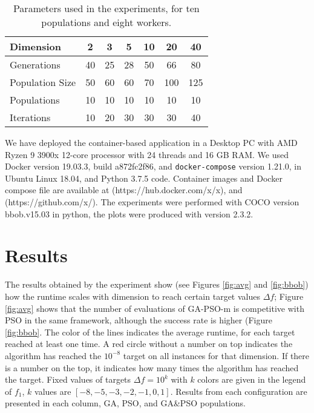 \begin{table}[h!tb]
  \small
  \caption{Parameters used in the experiments, for ten populations and eight workers.
  }
  \label{tab:params:10}
  \vspace{0.25cm}
  \centering
  \small
  \begin{tabular}{|l|c|c|c|c|c|c|}
    \hline
    Dimension        & 2  & 3  & 5  & 10 & 20  & 40  \\ \hline
    Generations      & 40 & 25 & 28 & 50 & 66  & 80  \\ \hline
    Population Size  & 50 & 60 & 60 & 70 & 100 & 125 \\ \hline
    Populations      & 10 & 10 & 10 & 10 & 10  & 10  \\ \hline
    Iterations       & 10 & 20 & 30 & 30 & 30  & 40  \\ \hline  
  \end{tabular}
\end{table}

We have deployed the container-based application in a
Desktop PC with AMD Ryzen 9 3900x 12-core processor with 24 threads 
and 16 GB RAM. We used Docker version 19.03.3, build a872fc2f86, and {\tt docker-compose} version 1.21.0, 
in Ubuntu Linux 18.04, and Python 3.7.5 code. Container images and Docker compose file are available at
(https://hub.docker.com/x/x), and (https://github.com/x/). 
The experiments were performed with COCO \cite{hansen2016coco} version bbob.v15.03 in python, 
the plots were produced with version 2.3.2.


\section{Results}
\label{results}

The results obtained by the experiment show (see Figures \ref{fig:avg} and \ref{fig:bbob}) how
the runtime scales with dimension to reach certain target values $\Delta f$; Figure \ref{fig:avg} shows that the number of evaluations of {\sf GA-PSO-m} is competitive with PSO in the same framework, although the success rate is higher (Figure \ref{fig:bbob}. %
The color of the lines indicates the average runtime, for each target reached
at least one time. A red circle without a number on top indicates the algorithm
has reached the $10^{-8}$ target on all instances for that dimension. If there
is a number on the top, it indicates how many times the algorithm has reached
the target. Fixed values of targets $\Delta f = 10^{k}$ with $k$ colors are
given in the legend of $f_1$, $k$ values are $[-8,-5,-3,-2,-1,0,1]$. Results
from each configuration are presented in each column, GA, PSO, and GA\&PSO
populations.

